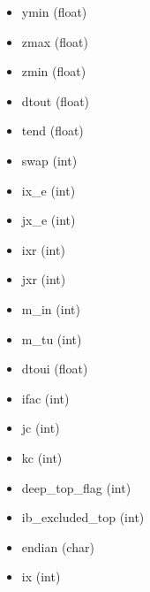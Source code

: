 \documentclass[letterpaper,10pt,dvipdfmx,report]{sphinxmanual}
\begin{document}
\begin{fulllineitems}
\begin{itemize}
\item {} 
ymin (float) \sphinxhyphen{}\sphinxhyphen{}

\item {} 
zmax (float) \sphinxhyphen{}\sphinxhyphen{}

\item {} 
zmin (float) \sphinxhyphen{}\sphinxhyphen{}

\item {} 
dtout (float) \sphinxhyphen{}\sphinxhyphen{}

\item {} 
tend (float) \sphinxhyphen{}\sphinxhyphen{}

\item {} 
swap (int) \sphinxhyphen{}\sphinxhyphen{}

\item {} 
ix\_e (int) \sphinxhyphen{}\sphinxhyphen{}

\item {} 
jx\_e (int) \sphinxhyphen{}\sphinxhyphen{}

\item {} 
ixr (int) \sphinxhyphen{}\sphinxhyphen{}

\item {} 
jxr (int) \sphinxhyphen{}\sphinxhyphen{}

\item {} 
m\_in (int) \sphinxhyphen{}\sphinxhyphen{}

\item {} 
m\_tu (int) \sphinxhyphen{}\sphinxhyphen{}

\item {} 
dtoui (float) \sphinxhyphen{}\sphinxhyphen{}

\item {} 
ifac (int) \sphinxhyphen{}\sphinxhyphen{}

\item {} 
jc (int) \sphinxhyphen{}\sphinxhyphen{}

\item {} 
kc (int) \sphinxhyphen{}\sphinxhyphen{}

\item {} 
deep\_top\_flag (int) \sphinxhyphen{}\sphinxhyphen{}

\item {} 
ib\_excluded\_top (int) \sphinxhyphen{}\sphinxhyphen{}

\item {} 
endian (char) \sphinxhyphen{}\sphinxhyphen{}

\item {} 
ix (int) \sphinxhyphen{}\sphinxhyphen{}


\end{itemize}
\end{fulllineitems}
\end{document}
